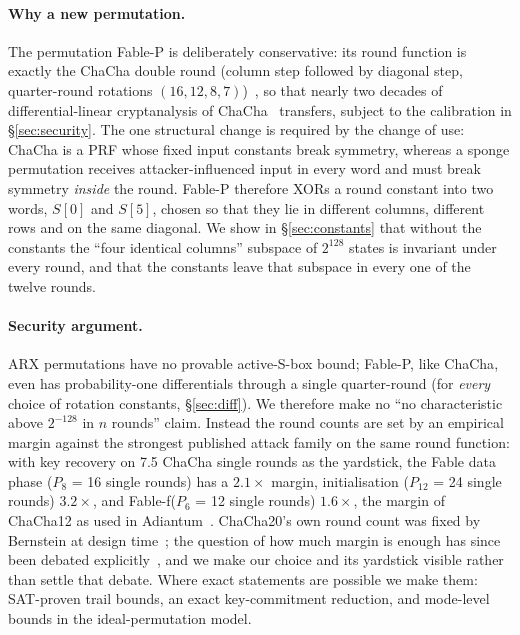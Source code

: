 \documentclass{iacrtrans}
\newcommand{\Fable}{\textsf{Fable}\xspace}
\newcommand{\FableP}{\textsf{Fable-P}\xspace}
\newcommand{\FableF}{\textsf{Fable-f}\xspace}
\newcommand{\ChaCha}{\textsf{ChaCha}\xspace}
\newcommand{\PP}[1]{P_{#1}}
\begin{document}
\paragraph{Why a new permutation.}
The permutation \FableP is deliberately conservative: its round function is exactly the \ChaCha double round (column step followed by diagonal step, quarter-round rotations $(16,12,8,7)$)~\cite{Bernstein08chacha}, so that nearly two decades of differential-linear cryptanalysis of \ChaCha~\cite{AFKMR08,BLT20,BBCDFLNT22,CS21,DGSS22,DGM23,WLHL23,Dey24,SDSM25,FT25,FT25b} transfers, subject to the calibration in \S\ref{sec:security}. The one structural change is required by the change of use: \ChaCha is a PRF whose fixed input constants break symmetry, whereas a sponge permutation receives attacker-influenced input in every word and must break symmetry \emph{inside} the round. \FableP therefore XORs a round constant into two words, $S[0]$ and $S[5]$, chosen so that they lie in different columns, different rows and on the same diagonal. We show in \S\ref{sec:constants} that without the constants the ``four identical columns'' subspace of $2^{128}$ states is invariant under every round, and that the constants leave that subspace in every one of the twelve rounds.

\paragraph{Security argument.}
ARX permutations have no provable active-S-box bound; \FableP, like \ChaCha, even has probability-one differentials through a single quarter-round (for \emph{every} choice of rotation constants, \S\ref{sec:diff}). We therefore make no ``no characteristic above $2^{-128}$ in $n$ rounds'' claim. Instead the round counts are set by an empirical margin against the strongest published attack family on the same round function: with key recovery on 7.5 \ChaCha single rounds as the yardstick, the \Fable data phase ($\PP{8}$ = 16 single rounds) has a $2.1\times$ margin, initialisation ($\PP{12}$ = 24 single rounds) $3.2\times$, and \FableF ($\PP{6}$ = 12 single rounds) $1.6\times$, the margin of ChaCha12 as used in Adiantum~\cite{Adiantum18}. ChaCha20's own round count was fixed by Bernstein at design time~\cite{Bernstein08salsa,Bernstein08chacha}; the question of how much margin is enough has since been debated explicitly~\cite{Aumasson20}, and we make our choice and its yardstick visible rather than settle that debate. Where exact statements are possible we make them: SAT-proven trail bounds, an exact key-commitment reduction, and mode-level bounds in the ideal-permutation model.
\end{document}
